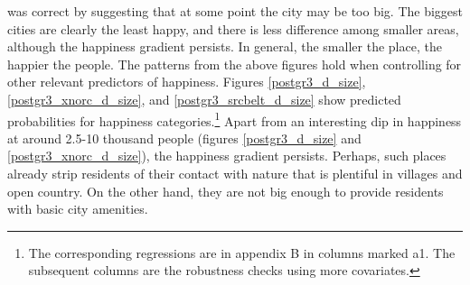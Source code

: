 \documentclass[12pt, letterpaper]{article}
\begin{document}
\begin{spacing}{1.9}
\citet{fischer73} was correct by suggesting that at some point the city
may be too big. The biggest cities are clearly the least happy, and there
is less difference among smaller areas, although the happiness
gradient persists. In general, the smaller the place, the happier the people.  The patterns from the above
figures hold when controlling for other relevant predictors of happiness.
Figures \ref{postgr3_d_size}, \ref{postgr3_xnorc_d_size}, and
\ref{postgr3_srcbelt_d_size} show predicted probabilities for happiness categories.\footnote{ The corresponding regressions  are in appendix B in
columns marked a1. The subsequent columns are the robustness checks
using more covariates.}
%
Apart from an interesting dip in happiness at around 2.5-10 thousand
people (figures \ref{postgr3_d_size} and \ref{postgr3_xnorc_d_size}),
 the happiness gradient persists. Perhaps,  such
  places already strip residents of their contact with nature that is plentiful
in villages and open country. On the other hand, they are not big
enough to provide residents with basic city amenities. 

  




\end{spacing}
\end{document}
